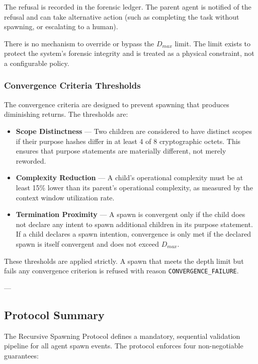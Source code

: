 The refusal is recorded in the forensic ledger. The parent agent is notified of the refusal and can take alternative action (such as completing the task without spawning, or escalating to a human).

There is no mechanism to override or bypass the $D_{max}$ limit. The limit exists to protect the system's forensic integrity and is treated as a physical constraint, not a configurable policy.

\subsubsection{Convergence Criteria Thresholds}

The convergence criteria are designed to prevent spawning that produces diminishing returns. The thresholds are:

\begin{itemize}
    \item \textbf{Scope Distinctness} — Two children are considered to have distinct scopes if their purpose hashes differ in at least 4 of 8 cryptographic octets. This ensures that purpose statements are materially different, not merely reworded.
    \item \textbf{Complexity Reduction} — A child's operational complexity must be at least 15\% lower than its parent's operational complexity, as measured by the context window utilization rate.
    \item \textbf{Termination Proximity} — A spawn is convergent only if the child does not declare any intent to spawn additional children in its purpose statement. If a child declares a spawn intention, convergence is only met if the declared spawn is itself convergent and does not exceed $D_{max}$.
\end{itemize}

These thresholds are applied strictly. A spawn that meets the depth limit but fails any convergence criterion is refused with reason \texttt{CONVERGENCE\_FAILURE}.

---

\subsection{Protocol Summary}

The Recursive Spawning Protocol defines a mandatory, sequential validation pipeline for all agent spawn events. The protocol enforces four non-negotiable guarantees:

